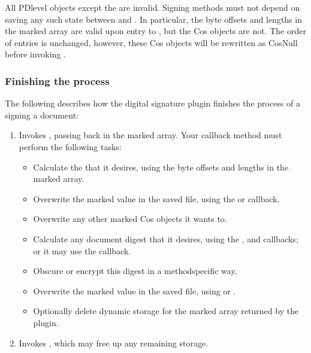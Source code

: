 \documentclass[letterpaper,12pt,english,openany,oneside]{sphinxmanual}
\begin{document}
All PD\sphinxhyphen{}level objects except the  are invalid. Signing methods must not depend on saving any such state between  and . In particular, the byte offsets and lengths in the marked array are valid upon entry to , but the Cos objects are not. The order of entries is unchanged, however, these Cos objects will be rewritten as CosNull before invoking .


\subsubsection{Finishing the process}
\label{\detokenize{Plugins_ExtendedAPI:finishing-the-process}}
The following describes how the digital signature plugin finishes the process of a signing a document:
\begin{enumerate}
%
\item {} 
Invokes , passing back in the marked array. Your  callback method must perform the following tasks:
\begin{itemize}
\item {} 
Calculate the  that it desires, using the byte offsets and lengths in the marked array.

\item {} 
Overwrite the marked  value in the saved file, using the  or  callback.

\item {} 
Overwrite any other marked Cos objects it wants to.

\item {} 
Calculate any document digest that it desires, using the , and  callbacks; or it may use the  callback.

\item {} 
Obscure or encrypt this digest in a method\sphinxhyphen{}specific way.

\item {} 
Overwrite the marked  value in the saved file, using  or .

\item {} 
Optionally delete dynamic storage for the marked array returned by the plugin.

\end{itemize}

\item {} 
Invokes , which may free up any remaining storage.

\end{enumerate}
\end{document}
